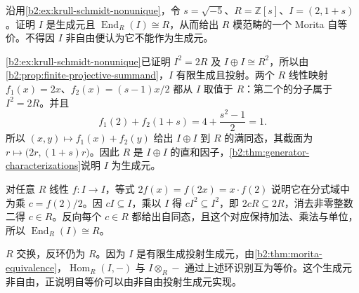 \begin{exercise}\label{b2:ex:16-ideal-autoequivalence}
	沿用\cref{b2:ex:krull-schmidt-nonunique}，令 \(s=\sqrt{-5}\)、\(R=\mathbb Z[s]\)、\(I=(2,1+s)\)。证明 \(I\) 是生成元且 \(\operatorname{End}_R(I)\cong R\)，从而给出 \(R\) 模范畴的一个 Morita 自等价。不得因 \(I\) 非自由便认为它不能作为生成元。
\end{exercise}
\begin{solution}
	\cref{b2:ex:krull-schmidt-nonunique}已证明 \(I^2=2R\) 及 \(I\oplus I\cong R^2\)，所以由\cref{b2:prop:finite-projective-summand}，\(I\) 有限生成且投射。两个 \(R\) 线性映射 \(f_1(x)=2x\)、\(f_2(x)=(s-1)x/2\) 都从 \(I\) 取值于 \(R\)：第二个的分子属于 \(I^2=2R\)。并且
	\[
		f_1(2)+f_2(1+s)=4+\frac{s^2-1}{2}=1.
	\]
	所以 \((x,y)\mapsto f_1(x)+f_2(y)\) 给出 \(I\oplus I\) 到 \(R\) 的满同态，其截面为 \(r\mapsto\bigl(2r,(1+s)r\bigr)\)。因此 \(R\) 是 \(I\oplus I\) 的直和因子，\cref{b2:thm:generator-characterizations}说明 \(I\) 为生成元。

	对任意 \(R\) 线性 \(f:I\rightarrow I\)，等式 \(2f(x)=f(2x)=x\cdot f(2)\) 说明它在分式域中为乘 \(c=f(2)/2\)。因 \(cI\subseteq I\)，乘以 \(I\) 得 \(cI^2\subseteq I^2\)，即 \(2cR\subseteq2R\)，消去非零整数二得 \(c\in R\)。反向每个 \(c\in R\) 都给出自同态，且这个对应保持加法、乘法与单位，所以 \(\operatorname{End}_R(I)\cong R\)。

	\(R\) 交换，反环仍为 \(R\)。因为 \(I\) 是有限生成投射生成元，由\cref{b2:thm:morita-equivalence}，\(\operatorname{Hom}_R(I,-)\) 与 \(I\otimes_R-\) 通过上述环识别互为等价。这个生成元非自由，正说明自等价可以由非自由投射生成元实现。
\end{solution}
